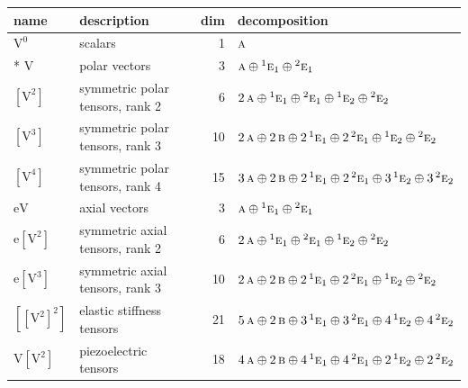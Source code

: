 \documentclass[10pt,a4paper]{article}
\numberwithin{equation}{section}
\newcommand{\irr}[1]{\text{\normalfont\scshape #1}}
\newcommand{\conjpair}[1]{{}^{#1}}
\newcommand{\jahn}[1]{\mathrm{#1}}
\newlength{\fillwidth}\newlength{\cellwidth}\newlength{\colwidth}
\begin{document}
{\begin{longtable}{@{}llr>{\RaggedRight\arraybackslash}p{\fillwidth}@{}}
name & description & dim & decomposition\\\midrule\endhead
\bottomrule\endfoot\endlastfoot
$\jahn{V^{0}}$ & scalars & 1 & $\irr{a}$\\*
$\jahn{V}$ & polar vectors & 3 & $\irr{a} \oplus\allowbreak \conjpair{1}\irr{e}_{1} \oplus\allowbreak \conjpair{2}\irr{e}_{1}$\\
$\jahn{[V^{2}]}$ & symmetric polar tensors, rank 2 & 6 & $2\,\irr{a} \oplus\allowbreak \conjpair{1}\irr{e}_{1} \oplus\allowbreak \conjpair{2}\irr{e}_{1} \oplus\allowbreak \conjpair{1}\irr{e}_{2} \oplus\allowbreak \conjpair{2}\irr{e}_{2}$\\
$\jahn{[V^{3}]}$ & symmetric polar tensors, rank 3 & 10 & $2\,\irr{a} \oplus\allowbreak 2\,\irr{b} \oplus\allowbreak 2\,\conjpair{1}\irr{e}_{1} \oplus\allowbreak 2\,\conjpair{2}\irr{e}_{1} \oplus\allowbreak \conjpair{1}\irr{e}_{2} \oplus\allowbreak \conjpair{2}\irr{e}_{2}$\\
$\jahn{[V^{4}]}$ & symmetric polar tensors, rank 4 & 15 & $3\,\irr{a} \oplus\allowbreak 2\,\irr{b} \oplus\allowbreak 2\,\conjpair{1}\irr{e}_{1} \oplus\allowbreak 2\,\conjpair{2}\irr{e}_{1} \oplus\allowbreak 3\,\conjpair{1}\irr{e}_{2} \oplus\allowbreak 3\,\conjpair{2}\irr{e}_{2}$\\
$\jahn{eV}$ & axial vectors & 3 & $\irr{a} \oplus\allowbreak \conjpair{1}\irr{e}_{1} \oplus\allowbreak \conjpair{2}\irr{e}_{1}$\\
$\jahn{e[V^{2}]}$ & symmetric axial tensors, rank 2 & 6 & $2\,\irr{a} \oplus\allowbreak \conjpair{1}\irr{e}_{1} \oplus\allowbreak \conjpair{2}\irr{e}_{1} \oplus\allowbreak \conjpair{1}\irr{e}_{2} \oplus\allowbreak \conjpair{2}\irr{e}_{2}$\\
$\jahn{e[V^{3}]}$ & symmetric axial tensors, rank 3 & 10 & $2\,\irr{a} \oplus\allowbreak 2\,\irr{b} \oplus\allowbreak 2\,\conjpair{1}\irr{e}_{1} \oplus\allowbreak 2\,\conjpair{2}\irr{e}_{1} \oplus\allowbreak \conjpair{1}\irr{e}_{2} \oplus\allowbreak \conjpair{2}\irr{e}_{2}$\\
$\jahn{[[V^{2}]^{2}]}$ & elastic stiffness tensors & 21 & $5\,\irr{a} \oplus\allowbreak 2\,\irr{b} \oplus\allowbreak 3\,\conjpair{1}\irr{e}_{1} \oplus\allowbreak 3\,\conjpair{2}\irr{e}_{1} \oplus\allowbreak 4\,\conjpair{1}\irr{e}_{2} \oplus\allowbreak 4\,\conjpair{2}\irr{e}_{2}$\\
$\jahn{V[V^{2}]}$ & piezoelectric tensors & 18 & $4\,\irr{a} \oplus\allowbreak 2\,\irr{b} \oplus\allowbreak 4\,\conjpair{1}\irr{e}_{1} \oplus\allowbreak 4\,\conjpair{2}\irr{e}_{1} \oplus\allowbreak 2\,\conjpair{1}\irr{e}_{2} \oplus\allowbreak 2\,\conjpair{2}\irr{e}_{2}$\\

\end{longtable}}
\end{document}
